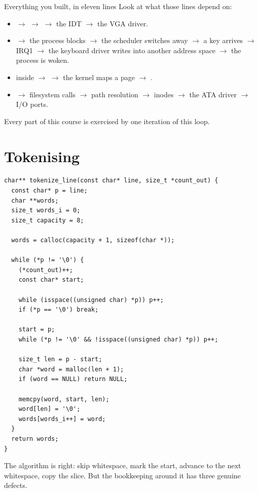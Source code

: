\begin{concept}{Everything you built, in eleven lines}
Look at what those lines depend on:
\begin{itemize}
  \item {} $\rightarrow$  $\rightarrow$  $\rightarrow$ the IDT
        $\rightarrow$ the VGA driver.
  \item {} $\rightarrow$ the process blocks $\rightarrow$ the scheduler switches away
        $\rightarrow$ a key arrives $\rightarrow$ IRQ1 $\rightarrow$ the keyboard driver writes into
        another address space $\rightarrow$ the process is woken.
  \item {} inside  $\rightarrow$  $\rightarrow$ the kernel
        maps a page $\rightarrow$ .
  \item {} $\rightarrow$ filesystem calls $\rightarrow$ path resolution
        $\rightarrow$ inodes $\rightarrow$ the ATA driver $\rightarrow$ I/O ports.
\end{itemize}
Every part of this course is exercised by one iteration of this loop.
\end{concept}

\section{Tokenising}

\begin{lstlisting}[style=c]
char** tokenize_line(const char* line, size_t *count_out) {
  const char* p = line;
  char **words;
  size_t words_i = 0;
  size_t capacity = 8;

  words = calloc(capacity + 1, sizeof(char *));

  while (*p != '\0') {
    (*count_out)++;
    const char* start;

    while (isspace((unsigned char) *p)) p++;
    if (*p == '\0') break;

    start = p;
    while (*p != '\0' && !isspace((unsigned char) *p)) p++;

    size_t len = p - start;
    char *word = malloc(len + 1);
    if (word == NULL) return NULL;

    memcpy(word, start, len);
    word[len] = '\0';
    words[words_i++] = word;
  }
  return words;
}
\end{lstlisting}

The algorithm is right: skip whitespace, mark the start, advance to the next whitespace, copy the
slice. But the bookkeeping around it has three genuine defects.

